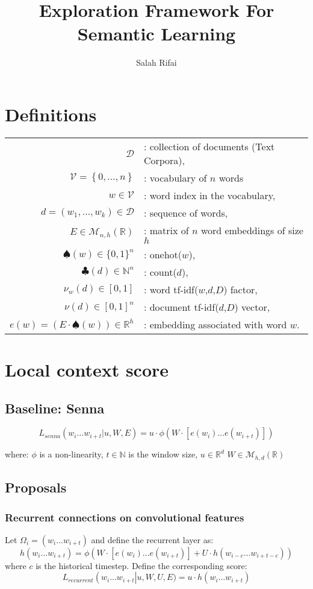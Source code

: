 \documentclass[11pt]{article} %
\title{Exploration Framework For Semantic Learning}
\author{Salah Rifai}
\begin{document}
\maketitle
\section{Definitions}
\begin{tabular}{r l}
 $\mathcal{D}$ &:  collection of documents (Text Corpora), \\
$\mathcal{V} = \left\{0,\ldots,n\right\}$ &: vocabulary of $n$ words \\
 $w \in \mathcal{V}$ &: word index in the vocabulary,\\
 $d = (w_1,\ldots,w_k) \in \mathcal{D}$ &: sequence of words, \\
$E \in \mathcal{M}_{n,h}(\mathbb{R})$&: matrix of $n$ word embeddings of size $h$\\
$\spadesuit(w) \in \{0,1\}^n$&: onehot($w$), \\
$\clubsuit(d) \in \mathbb{N}^n$&: count($d$), \\
$ \nu_w (d) \in \left[0,1\right]$ &: word tf-idf($w$,$d$,$D$) factor, \\
$\nu(d) \in  \left[0,1\right]^n$&: document tf-idf($d$,$D$) vector, \\
$ e(w)=\left(E\cdot\spadesuit\left(w\right)\right)  \in \mathbb{R}^h$&: embedding associated with word $w$.
\end{tabular} 

\section{Local context score}
\subsection{Baseline: Senna}

\[ L_{senna} \left(w_i\ldots w_{i+t}  | u,W,E\right) = u \cdot \phi \left( W \cdot \left[ e\left(w_i\right) \ldots e\left(w_{i+t}\right) \right] \right)  \]

where:
$\phi$ is a non-linearity, $t \in \mathbb{N}$ is the window size, $u \in \mathbb{R}^d$  $W \in \mathcal{M}_{h,d}(\mathbb{R})$
\subsection{Proposals}
\subsubsection{Recurrent connections on convolutional features}
Let $\Omega_i =  \left(w_i\ldots w_{i+t} \right)$ and define the recurrent layer as:
\[\displaystyle h \left(w_i\ldots w_{i+t} \right) = \phi\left( W \cdot \left[ e\left(w_i\right) \ldots e\left(w_{i+t}\right) \right] + U  \cdot h \left(w_{i-c}\ldots w_{i+t-c} \right)\right)\]
where $c$ is the historical timestep. Define the corresponding score:
\[ L_{recurrent} \left(w_i\ldots w_{i+t} \right | u,W,U,E) = u \cdot h \left(w_i\ldots w_{i+t} \right)   \]
\end{document}
